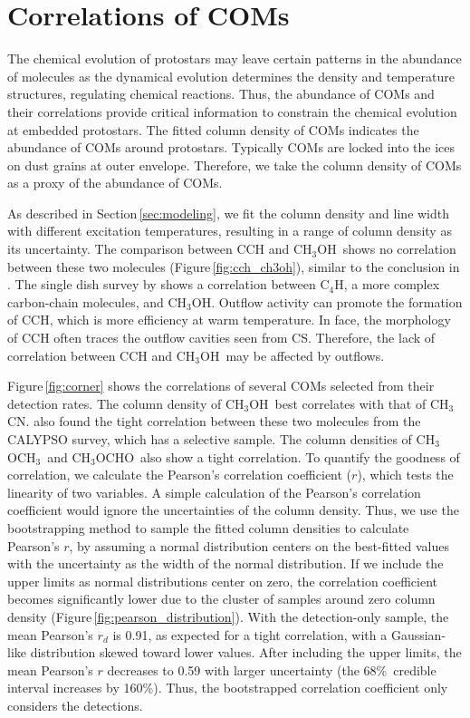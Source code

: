 \documentclass[twocolumn]{aastex62}
\newcommand{\methylformate}{\mbox{CH$_{3}$OCHO}}
\newcommand{\methanol}{\mbox{CH$_{3}$OH}}
\newcommand{\dimethylether}{\mbox{CH$_{3}$OCH$_{3}$}}
\newcommand{\methylcyanide}{\mbox{CH$_{3}$CN}}
\begin{document}
\section{Correlations of COMs}
The chemical evolution of protostars may leave certain patterns in the abundance of molecules as the dynamical evolution determines the density and temperature structures, regulating chemical reactions.  Thus, the abundance of COMs and their correlations provide critical information to constrain the chemical evolution at embedded protostars.  The fitted column density of COMs indicates the abundance of COMs around protostars.  Typically COMs are locked into the ices on dust grains at outer envelope. Therefore, we take the column density of COMs as a proxy of the abundance of COMs.  

As described in Section\,\ref{sec:modeling}, we fit the column density and line width with different excitation temperatures, resulting in a range of column density as its uncertainty.  The comparison between CCH and \methanol\ shows no correlation between these two molecules (Figure\,\ref{fig:cch_ch3oh}), similar to the conclusion in \citet{2018ApJS..236...52H}.  The single dish survey by \citet{2016ApJ...833..125G} shows a correlation between C$_{4}$H, a more complex carbon-chain molecules, and \methanol.  Outflow activity can promote the formation of CCH, which is more efficiency at warm temperature.  In face, the morphology of CCH often traces the outflow cavities seen from CS.  Therefore, the lack of correlation between CCH and \methanol\ may be affected by outflows.

Figure\,\ref{fig:corner} shows the correlations of several COMs selected from their detection rates.  The column density of \methanol\ best correlates with that of \methylcyanide.  \citet{2020A&A...635A.198B} also found the tight correlation between these two molecules from the CALYPSO survey, which has a selective sample.  The column densities of \dimethylether\ and \methylformate\ also show a tight correlation.  To quantify the goodness of correlation, we calculate the Pearson's correlation coefficient ($r$), which tests the linearity of two variables.  A simple calculation of the Pearson's correlation coefficient would ignore the uncertainties of the column density.  Thus, we use the bootstrapping method to sample the fitted column densities to calculate Pearson's $r$, by assuming a normal distribution centers on the best-fitted values with the uncertainty as the width of the normal distribution.  If we include the upper limits as normal distributions center on zero, the correlation coefficient becomes significantly lower due to the cluster of samples around zero column density (Figure\,\ref{fig:pearson_distribution}).  With the detection-only sample, the mean Pearson's $r_{d}$ is 0.91, as expected for a tight correlation, with a Gaussian-like distribution skewed toward lower values.  After including the upper limits, the mean Pearson's $r$ decreases to 0.59 with larger uncertainty (the 68\%\ credible interval increases by 160\%).  Thus, the bootstrapped correlation coefficient only considers the detections.
\end{document}
